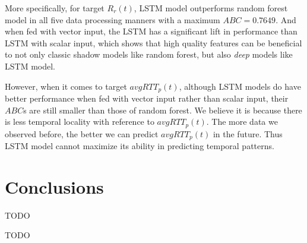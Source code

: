 \documentclass[sigconf]{acmart}
\begin{document}
	More specifically, for target $R_r(t)$, LSTM model outperforms random forest model in all five data processing manners with a maximum $ABC=0.7649$. And when fed with vector input, the LSTM has a significant lift in performance than LSTM with scalar input, which shows that high quality features can be beneficial to not only classic shadow models like random forest, but also \textit{deep} models like LSTM model.
	
	However, when it comes to target $avgRTT_p(t)$, although LSTM models do have better performance when fed with vector input rather than scalar input, their $ABC$s are still smaller than those of random forest. We believe it is because there is less temporal locality with reference to $avgRTT_p(t)$. The more data we observed before, the better we can predict $avgRTT_p(t)$ in the future. Thus LSTM model cannot maximize its ability in predicting temporal patterns.
	\section{Conclusions}
	TODO
	
	\begin{acks}
		TODO
	\end{acks}
	
	
	
	
	 
	
\end{document}
